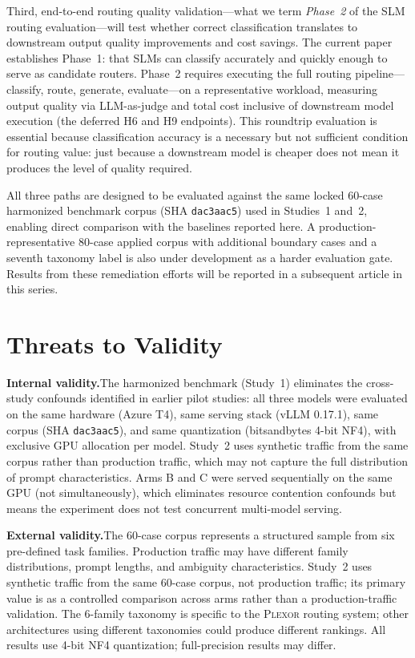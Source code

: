 \documentclass{article}
\newcommand{\plexor}{\textsc{Plexor}}
\begin{document}
Third, end-to-end routing quality validation---what we term \emph{Phase~2} of the SLM routing evaluation---will test whether correct classification translates to downstream output quality improvements and cost savings. The current paper establishes Phase~1: that SLMs can classify accurately and quickly enough to serve as candidate routers. Phase~2 requires executing the full routing pipeline---classify, route, generate, evaluate---on a representative workload, measuring output quality via LLM-as-judge \citep{zheng2024llmasjudge} and total cost inclusive of downstream model execution (the deferred H6 and H9 endpoints). This roundtrip evaluation is essential because classification accuracy is a necessary but not sufficient condition for routing value: just because a downstream model is cheaper does not mean it produces the level of quality required.

All three paths are designed to be evaluated against the same locked 60-case harmonized benchmark corpus (SHA \texttt{dac3aac5}) used in Studies~1 and~2, enabling direct comparison with the baselines reported here. A production-representative 80-case applied corpus with additional boundary cases and a seventh taxonomy label is also under development as a harder evaluation gate. Results from these remediation efforts will be reported in a subsequent article in this series.

\section{Threats to Validity}
\label{sec:threats}

\textbf{Internal validity.}\quad The harmonized benchmark (Study~1) eliminates the cross-study confounds identified in earlier pilot studies: all three models were evaluated on the same hardware (Azure T4), same serving stack (vLLM 0.17.1), same corpus (SHA \texttt{dac3aac5}), and same quantization (bitsandbytes 4-bit NF4), with exclusive GPU allocation per model. Study~2 uses synthetic traffic from the same corpus rather than production traffic, which may not capture the full distribution of prompt characteristics. Arms B and C were served sequentially on the same GPU (not simultaneously), which eliminates resource contention confounds but means the experiment does not test concurrent multi-model serving.

\textbf{External validity.}\quad The 60-case corpus represents a structured sample from six pre-defined task families. Production traffic may have different family distributions, prompt lengths, and ambiguity characteristics. Study~2 uses synthetic traffic from the same 60-case corpus, not production traffic; its primary value is as a controlled comparison across arms rather than a production-traffic validation. The 6-family taxonomy is specific to the \plexor{} routing system; other architectures using different taxonomies could produce different rankings. All results use 4-bit NF4 quantization; full-precision results may differ.
\end{document}
